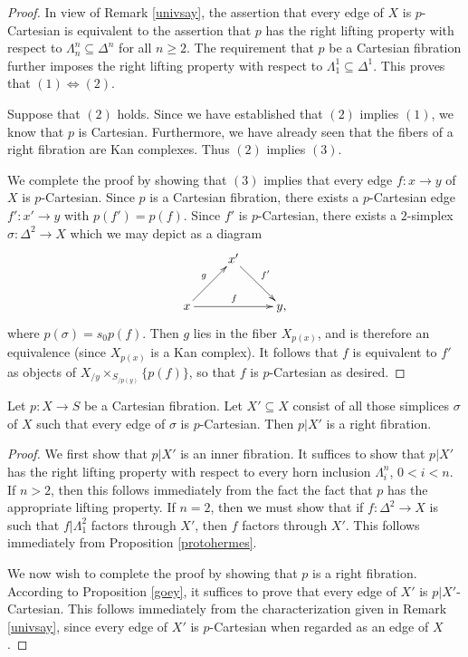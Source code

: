 \begin{proof}
In view of Remark \ref{univsay}, the assertion that every edge of $X$ is $p$-Cartesian is equivalent to the assertion that $p$ has the right lifting property with respect to $\Lambda^n_n \subseteq \Delta^n$ for all $n \geq 2$. The requirement that $p$ be a Cartesian fibration further imposes the right lifting property with respect to $\Lambda^1_1 \subseteq \Delta^1$. This proves that $(1) \Leftrightarrow (2)$.

Suppose that $(2)$ holds. Since we have established that $(2)$ implies $(1)$, we know that $p$ is Cartesian. Furthermore, we have already seen that the fibers of a right fibration are Kan complexes. Thus $(2)$ implies $(3)$.

We complete the proof by showing that $(3)$ implies that every edge $f: x \rightarrow y$
of $X$ is $p$-Cartesian. Since $p$ is a Cartesian fibration, there exists a $p$-Cartesian edge $f': x' \rightarrow y$
with $p(f') = p(f)$. Since $f'$ is $p$-Cartesian, 
there exists a $2$-simplex $\sigma: \Delta^2 \rightarrow X$ which we may depict as a diagram
$$ \xymatrix{ & x' \ar[dr]^{f'} & \\
x \ar[ur]^{g} \ar[rr]^{f} & & y, }$$
where $p(\sigma) = s_0 p(f)$. Then $g$ lies in the fiber $X_{p(x)}$, and is therefore an equivalence (since $X_{p(x)}$ is a Kan complex). It follows that $f$ is equivalent to $f'$ as objects of
$X_{/y} \times_{ S_{/p(y)} } \{p(f) \}$, so that $f$ is $p$-Cartesian as desired.
\end{proof}

\begin{corollary}\label{relativeKan}
Let $p: X \rightarrow S$ be a Cartesian fibration. Let $X'
\subseteq X$ consist of all those simplices $\sigma$ of $X$ such that
every edge of $\sigma$ is $p$-Cartesian. Then $p|X'$ is a right fibration.
\end{corollary}

\begin{proof}
We first show that $p|X'$ is an inner fibration. It suffices to show
that $p|X'$ has the right lifting property with respect to every
horn inclusion $\Lambda^n_i$, $0 < i < n$. If $n > 2$, then
this follows immediately from the fact the fact that $p$ has the
appropriate lifting property. If $n = 2$, then we must show that
if $f: \Delta^2 \rightarrow X$ is such that $f|\Lambda^2_1$
factors through $X'$, then $f$ factors through $X'$. This follows immediately from Proposition \ref{protohermes}.

We now wish to complete the proof by showing that $p$ is a right fibration. According to
Proposition \ref{goey}, it suffices to prove that every edge of $X'$ is $p|X'$-Cartesian. This follows immediately from the characterization given in Remark \ref{univsay}, since every edge of $X'$ is $p$-Cartesian when regarded as an edge of $X$.
\end{proof}

